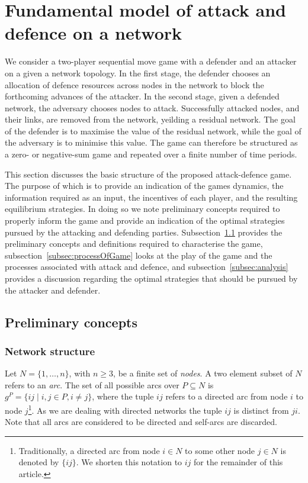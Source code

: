 \documentclass[11pt,fleqn]{article}
\begin{document}
\section{Fundamental model of attack and defence on a network}
\label{sec:basicModel}

We consider a two-player sequential move game with a defender and an attacker on a given a network topology. In the first stage, the defender chooses an allocation of defence resources across nodes in the network to block the forthcoming advances of the attacker. In the second stage, given a defended network, the adversary chooses nodes to attack. Successfully attacked nodes, and their links, are removed from the network, yeilding a residual network. The goal of the defender is to maximise the value of the residual network, while the goal of the adversary is to minimise this value. The game can therefore be structured as a zero- or negative-sum game and repeated over a finite number of time periods.

This section discusses the basic structure of the proposed attack-defence game. The purpose of which is to provide an indication of the games dynamics, the information required as an input, the incentives of each player, and the resulting equilibrium strategies. In doing so we note preliminary concepts required to properly inform the game and provide an indication of the optimal strategies pursued by the attacking and defending parties. Subsection~\ref{subsec:preliminaries} provides the preliminary concepts and definitions required to characterise the game, subsection~\ref{subsec:processOfGame} looks at the play of the game and the processes associated with attack and defence, and subsection~\ref{subsec:analysis} provides a discussion regarding the optimal strategies that should be pursued by the attacker and defender.

\subsection{Preliminary concepts}
\label{subsec:preliminaries}

\subsubsection{Network structure}

Let $N = \{ 1, \ldots, n \}$, with $n \geq 3$, be a finite set of \emph{nodes}. A two element subset of $N$ refers to an \emph{arc}. The set of all possible arcs over $P \subseteq N$ is $g^{P} = \{ ij \mid i,j \in P, i \neq j \}$, where the tuple $ij$ refers to a directed arc from node $i$ to node $j$\footnote{Traditionally, a directed arc from node $i \in N$ to some other node $j \in N$ is denoted by $\{ ij \}$. We shorten this notation to $ij$ for the remainder of this article.}. As we are dealing with directed networks the tuple $ij$ is distinct from $ji$. Note that all arcs are considered to be directed and self-arcs are discarded. 
\end{document}
